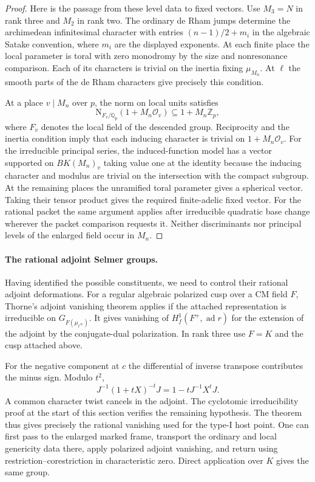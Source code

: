 \begin{proof}
Here is the passage from these level data to fixed vectors.
Use \(M_3=N\) in rank three and \(M_2\) in rank two.
The ordinary de Rham jumps determine the archimedean
infinitesimal character with entries \((n-1)/2+m_i\)
in the algebraic Satake convention, where \(m_i\) are
the displayed exponents. At each finite place the local
parameter is toral with zero monodromy by the size and
nonresonance comparison. Each of its characters is trivial
on the inertia fixing \(\mu_{M_n}\). At \(\ell\) the smooth
parts of the de Rham characters give precisely this
condition.

At a place \(v\mid M_n\) over \(p\), the norm on local units satisfies
\[
 \mathrm N_{F_v/\mathbb Q_p}(1+M_n\mathcal O_v)
                    \subseteq 1+M_n\mathbb Z_p ,
\]
where \(F_v\) denotes the local field of the descended group.
Reciprocity and the inertia condition imply that each inducing
character is trivial on \(1+M_n\mathcal O_v\).
For the irreducible principal series, the induced-function
model has a vector supported on \(B K(M_n)_v\) taking
value one at the identity because the inducing character and
modulus are trivial on the intersection with the compact
subgroup. At the remaining places the unramified toral
parameter gives a spherical vector. Taking their tensor
product gives the required finite-adelic fixed vector.
For the rational packet the same argument applies after
irreducible quadratic base change wherever the packet
comparison requests it. Neither discriminants nor
principal levels of the enlarged field occur in \(M_n\).

\end{proof}

\paragraph{The rational adjoint Selmer groups.}
Having identified the possible constituents, we need to control their rational adjoint
deformations. For a regular algebraic polarized cusp over a CM field
\(F\), Thorne's adjoint vanishing theorem applies if the
attached representation is irreducible on
\(G_{F(\mu_{\ell^\infty})}\). It gives vanishing of
\(H_f^1(F^+,\operatorname{ad}r)\) for the extension of
the adjoint by the conjugate-dual polarization. In rank three
use \(F=K\) and the cusp attached above.

For the negative component at \(c\) the differential of inverse transpose contributes the minus sign. Modulo \(t^2\),
\[
 J^{-1}(1+tX)^{-t}J=1-tJ^{-1}X^tJ .
\] A
common character twist cancels in the adjoint. The
cyclotomic irreducibility proof at the start of this
section verifies the remaining hypothesis. The theorem thus
gives precisely the rational vanishing used for the type-I
host point. One can first pass to the enlarged marked frame, transport the ordinary and local genericity data
there, apply polarized adjoint vanishing, and return using restriction--corestriction in characteristic
zero. Direct application over \(K\) gives the same group.
\hfill\mbox{\cite{thorne-adjoint}}

